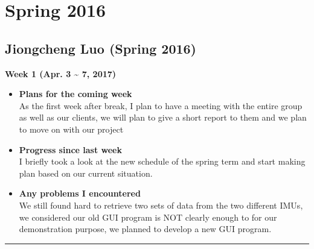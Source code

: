 \newpage
	\section{Spring 2016}

	\subsection{Jiongcheng Luo (Spring 2016)}
	\vspace{0.5cm}

	\begin{center}
		\textbf{Week 1 (Apr. 3 {\textasciitilde{}} 7, 2017)}
	\end{center}
	\begin{itemize}
		\item \textbf{Plans for the coming week}
		\\As the first week after break, I plan to have a meeting with the entire group as well as our clients, we will plan to give a short report to them and we plan to move on with our project\\

		\item \textbf{Progress since last week}
		\\I briefly took a look at the new schedule of the spring term and start making plan based on our current situation.\\

		\item \textbf{Any problems I encountered}
		\\We still found hard to retrieve two sets of data from the two different IMUs, we considered our old GUI program is NOT clearly enough to for our demonstration purpose, we planned to develop a new GUI program.\\
	\end{itemize}

	\rule{\textwidth}{0.5pt}

